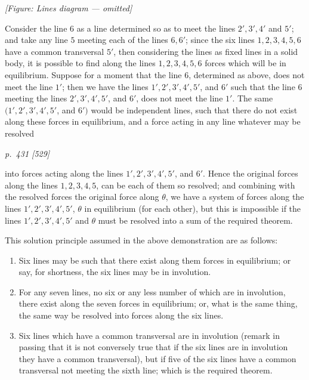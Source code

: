 \documentclass[11pt,a4paper]{book}
\begin{document}
\begin{center}
\textit{[Figure: Lines diagram --- omitted]}
\end{center}

Consider the line $6$ as a line determined so as to meet the lines $2', 3', 4'$ and $5'$;
and take any line $5$ meeting each of the lines $6, 6'$; since the six lines $1, 2, 3, 4, 5, 6$
have a common transversal $5'$, then considering the lines as fixed lines in a solid
body, it is possible to find along the lines $1, 2, 3, 4, 5, 6$ forces which will be in
equilibrium. Suppose for a moment that the line $6$, determined as above, does not
meet the line $1'$; then we have the lines $1', 2', 3', 4', 5'$, and $6'$ such that the
line $6$ meeting the lines $2', 3', 4', 5'$, and $6'$, does not meet the line $1'$. The same
$(1', 2', 3', 4', 5'$, and $6')$ would be independent lines, such that there do not exist along
these forces in equilibrium, and a force acting in any line whatever may be resolved

\clearpage

\bigskip
\textit{p.~431 [529]}
\smallskip

into forces acting along the lines $1', 2', 3', 4', 5'$, and $6'$. Hence the original forces
along the lines $1, 2, 3, 4, 5$, can be each of them so resolved; and combining with
the resolved forces the original force along $\theta$, we have a system of forces along the
lines $1', 2', 3', 4', 5'$, $\theta$ in equilibrium (for each other), but this is impossible if the lines
$1', 2', 3', 4', 5'$ and $\theta$ must be resolved into a sum of the required theorem.

This solution principle assumed in the above demonstration are as follows:
\begin{enumerate}[label=(\arabic*)]
\item Six lines may be such that there exist along them forces in equilibrium;
or say, for shortness, the six lines may be in involution.
\item For any seven lines, no six or any less number of which are in involution, there exist along the seven forces in equilibrium; or, what is the same thing, the same way be resolved into forces along the six lines.
\item Six lines which have a common transversal are in involution (remark in passing that it is not conversely true that if the six lines are in involution they have a common transversal), but if five of the six lines have a common transversal not meeting the sixth line; which is the required theorem.
\end{enumerate}
\end{document}
